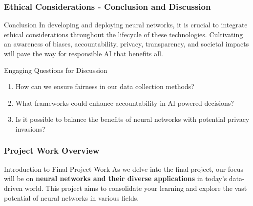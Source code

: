 \documentclass[aspectratio=169]{beamer}
\begin{document}
\begin{frame}[fragile]
    \frametitle{Ethical Considerations - Conclusion and Discussion}
    \begin{block}{Conclusion}
        In developing and deploying neural networks, it is crucial to integrate ethical considerations throughout the lifecycle of these technologies. Cultivating an awareness of biases, accountability, privacy, transparency, and societal impacts will pave the way for responsible AI that benefits all.
    \end{block}
    \begin{block}{Engaging Questions for Discussion}
        \begin{enumerate}
            \item How can we ensure fairness in our data collection methods?
            \item What frameworks could enhance accountability in AI-powered decisions?
            \item Is it possible to balance the benefits of neural networks with potential privacy invasions?
        \end{enumerate}
    \end{block}
\end{frame}

\begin{frame}[fragile]
    \frametitle{Project Work Overview}
    \begin{block}{Introduction to Final Project Work}
        As we delve into the final project, our focus will be on \textbf{neural networks and their diverse applications} in today’s data-driven world. 
        This project aims to consolidate your learning and explore the vast potential of neural networks in various fields.
    \end{block}
\end{frame}
\end{document}
